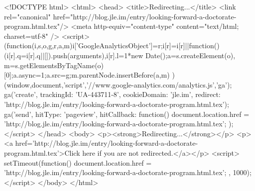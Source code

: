 <!DOCTYPE html>
<html>
<head>
<title>Redirecting...</title>
<link rel="canonical" href="http://blog.jle.im/entry/looking-forward-a-doctorate-program.html.tex"/>
<meta http-equiv="content-type" content="text/html; charset=utf-8" />
<script>
(function(i,s,o,g,r,a,m){i['GoogleAnalyticsObject']=r;i[r]=i[r]||function(){
(i[r].q=i[r].q||[]).push(arguments)},i[r].l=1*new Date();a=s.createElement(o),
m=s.getElementsByTagName(o)[0];a.async=1;a.src=g;m.parentNode.insertBefore(a,m)
})(window,document,'script','//www.google-analytics.com/analytics.js','ga');
ga('create', { trackingId: 'UA-443711-8', cookieDomain: 'jle.im', redirect: 'http://blog.jle.im/entry/looking-forward-a-doctorate-program.html.tex'});
ga('send', { hitType: 'pageview', hitCallback: function() { document.location.href = 'http://blog.jle.im/entry/looking-forward-a-doctorate-program.html.tex'; } });
</script>
</head>
<body>
  <p><strong>Redirecting...</strong></p>
  <p><a href='http://blog.jle.im/entry/looking-forward-a-doctorate-program.html.tex'>Click here if you are not redirected.</a></p>
  <script>
    setTimeout(function() { document.location.href = 'http://blog.jle.im/entry/looking-forward-a-doctorate-program.html.tex'; }, 1000);
  </script>
</body>
</html>
